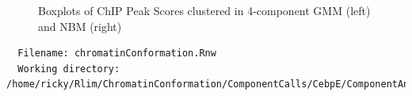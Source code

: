 \documentclass{article}\usepackage[]{graphicx}\usepackage[]{color}
\begin{document}
\begin{figure}[H]
    \centering
    \caption{Boxplots of ChIP Peak Scores clustered in 4-component GMM (left) and NBM (right)}
    \label{fig:sorted4CompBoxplot}
\end{figure}
\clearpage





\begin{verbatim}
  Filename: chromatinConformation.Rnw
  Working directory: /home/ricky/Rlim/ChromatinConformation/ComponentCalls/CebpE/ComponentAnalysis 
\end{verbatim}
\end{document}
